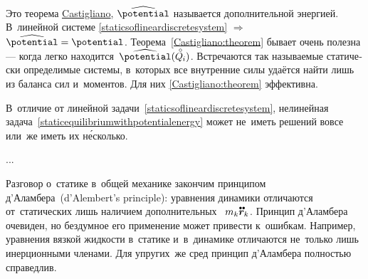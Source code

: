 \begin{otherlanguage}{russian}
\vspace{-0.1em}\noindent
Это теорема \href{https://en.wikipedia.org/wiki/Carlo_Alberto_Castigliano}{Castigliano}, $\widehat{\potential}$ называется дополнительной энергией.
В~линейной системе \eqref{staticsoflineardiscretesystem} ${\Rightarrow}$ ${\widehat{\potential} = \potential}$.
Теорема~\eqref{Castigliano:theorem} бывает очень полезна\:--- когда легко находится~${\widehat{\potential}(\mathcircabove{Q}_{\hspace{-0.1ex}i})}$.
Встречаются так называемые статически определимые системы, в~которых все внутренние силы удаётся найти лишь из баланса сил и~моментов.
Для них \eqref{Castigliano:theorem} эффективна.

В~отличие от линейной задачи~\eqref{staticsoflineardiscretesystem}, нелинейная задача~\eqref{staticequilibriumwithpotentialenergy} может не~иметь решений вовсе или~же иметь их н\'{е}сколько.

...

Разговор о~статике в~общей механике закончим принципом \hbox{д’\hspace{-0.2ex}Аламбера}~(\hbox{d’\hspace{-0.2ex}Alembert}’s principle): уравнения динамики отличаются от~статических лишь наличием дополнительных ~${m_k \mathdotdotabove{\locationvector}_k}$.
Принцип \hbox{д’\hspace{-0.2ex}Аламбера} очевиден, но бездумное его применение может привести к~ошибкам.
Например, уравнения вязкой жидкости в~статике и~в~динамике отличаются не~только лишь инерционными членами.
Для упругих~же сред принцип \hbox{д’\hspace{-0.2ex}Аламбера} полностью справедлив.

\end{otherlanguage}



\label{para:mechanicsofrelativemotion}

